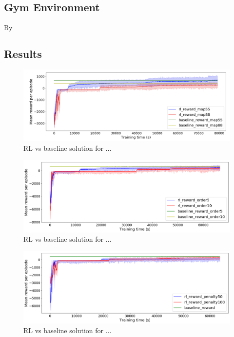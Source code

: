 \documentclass{article}
\begin{document}
\subsection{Gym Environment}

By



\subsection{Results}
\begin{figure}[h!]
	\centering
	\includegraphics[width=1\linewidth]{vrp_images/different_map_size.png}
	\caption{RL vs baseline solution for ...}
	\label{fig:vrp_map_size}
\end{figure}

\begin{figure}[h!]
	\centering
	\includegraphics[width=1\linewidth]{vrp_images/different_order_number.png}
	\caption{RL vs baseline solution for ...}
	\label{fig:vrp_order_number}
\end{figure}

\begin{figure}[h!]
	\centering
	\includegraphics[width=1\linewidth]{vrp_images/different_penalty.png}
	\caption{RL vs baseline solution for ...}
	\label{fig:vrp_penalty}
\end{figure}
\end{document}
